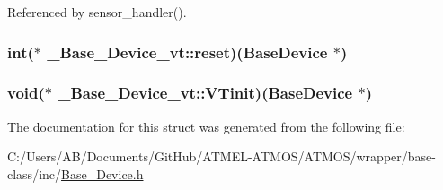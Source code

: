 Referenced by sensor\-\_\-handler().

\hypertarget{struct___base___device__vt_abb98aa8063ef90b5b8ac02eb060e4e68}{
\subsubsection[{reset}]{\setlength{\rightskip}{0pt plus 5cm}int($\ast$ \-\_\-\-Base\-\_\-\-Device\-\_\-vt\-::reset)({\bf Base\-Device} $\ast$)}}\label{struct___base___device__vt_abb98aa8063ef90b5b8ac02eb060e4e68}
\hypertarget{struct___base___device__vt_a01a71122bd9d5698a43fc7ea8b368c01}{
\subsubsection[{V\-Tinit}]{\setlength{\rightskip}{0pt plus 5cm}void($\ast$ \-\_\-\-Base\-\_\-\-Device\-\_\-vt\-::\-V\-Tinit)({\bf Base\-Device} $\ast$)}}\label{struct___base___device__vt_a01a71122bd9d5698a43fc7ea8b368c01}


The documentation for this struct was generated from the following file\-:\begin{DoxyCompactItemize}
\item 
C\-:/\-Users/\-A\-B/\-Documents/\-Git\-Hub/\-A\-T\-M\-E\-L-\/\-A\-T\-M\-O\-S/\-A\-T\-M\-O\-S/wrapper/base-\/class/inc/\hyperlink{_base___device_8h}{Base\-\_\-\-Device.\-h}\end{DoxyCompactItemize}
